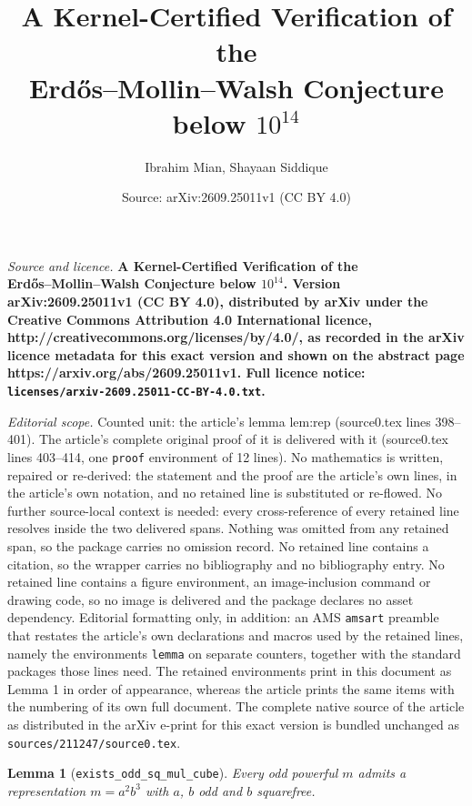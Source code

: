 \documentclass[10pt,a4paper]{amsart}
\title{\bfseries A Kernel-Certified Verification of the\\ Erd\H{o}s--Mollin--Walsh Conjecture below $10^{14}$}
\author{Ibrahim Mian, Shayaan Siddique}
\date{Source: arXiv:2609.25011v1 (CC BY 4.0)}
\newtheorem{lemma}{Lemma}
\newcommand{\code}[1]{\texttt{#1}}
\begin{document}
\maketitle

\noindent\emph{Source and licence.} \bfseries A Kernel-Certified Verification of the\\ Erd\H{o}s--Mollin--Walsh Conjecture below $10^{14}$. Version arXiv:2609.25011v1 (CC BY 4.0), distributed by arXiv under the Creative Commons Attribution 4.0 International licence, http://creativecommons.org/licenses/by/4.0/, as recorded in the arXiv licence metadata for this exact version and shown on the abstract page https://arxiv.org/abs/2609.25011v1. Full licence notice: \texttt{licenses/arxiv-2609.25011-CC-BY-4.0.txt}.\par\smallskip

\noindent\textit{Editorial scope.} Counted unit: the article's lemma lem:rep (source0.tex lines 398--401). The article's complete original proof of it is delivered with it (source0.tex lines 403--414, one \texttt{proof} environment of 12 lines). No mathematics is written, repaired or re-derived: the statement and the proof are the article's own lines, in the article's own notation, and no retained line is substituted or re-flowed.  No further source-local context is needed: every cross-reference of every retained line resolves inside the two delivered spans.  Nothing was omitted from any retained span, so the package carries no omission record.  No retained line contains a citation, so the wrapper carries no bibliography and no bibliography entry.  No retained line contains a figure environment, an image-inclusion command or drawing code, so no image is delivered and the package declares no asset dependency.  Editorial formatting only, in addition: an AMS \texttt{amsart} preamble that restates the article's own declarations and macros used by the retained lines, namely the environments \texttt{lemma} on separate counters, together with the standard packages those lines need.  The retained environments print in this document as Lemma 1 in order of appearance, whereas the article prints the same items with the numbering of its own full document.  The complete native source of the article as distributed in the arXiv e-print for this exact version is bundled unchanged as \texttt{sources/211247/source0.tex}.
\begin{lemma}[\code{exists\_odd\_sq\_mul\_cube}]\label{lem:rep}
Every odd powerful $m$ admits a representation $m = a^2 b^3$ with $a$,
$b$ odd and $b$ squarefree.
\end{lemma}
\end{document}
